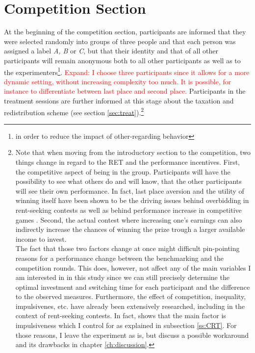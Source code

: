     
    \section{Competition Section}
    \label{ss:compt}
    
    At the beginning of the competition section, participants are informed that they were selected randomly into groups of three people and that each person was assigned a label \textit{A, B} or \textit{C}, but that their identity and that of all other participants will remain anonymous both to all other participants as well as to the experimenters\footnote{in order to reduce the impact of other-regarding behavior}. \textcolor{red}{Expand: I choose three participants since it allows for a more dynamic setting, without increasing complexity too much. It is possible, for instance to differentiate between last place and second place.}  Participants in the treatment sessions are further informed at this stage about the taxation and redistribution scheme (see section \ref{sec:treat}).\footnote{ Note that when moving from the introductory section to the competition, two things change in regard to the RET and the performance incentives. First, the competitive aspect of being in the group. Participants will have the possibility to see what others do and will know, that the other participants will see their own performance. In fact, last place aversion and the utility of winning itself have been shown to be the driving issues behind overbidding in rent-seeking contests as well as behind performance increase in competitive games \citep{sheremeta2013}. Second, the actual contest where increasing one's earnings can also indirectly increase the chances of winning the prize trough a larger available income to invest.\\
    The fact that those two factors change at once might difficult pin-pointing reasons for a performance change between the benchmarking and the competition rounds. This does, however, not affect any of the main variables I am interested in in this study since we can still precisely determine the optimal investment and switching time for each participant and the difference to the observed measures. Furthermore, the effect of competition, inequality, impulsivenes, etc. have already been extensively researched, including in the context of rent-seeking contests. In fact, \cite{sheremeta2016} shows that the main factor is impulsiveness which I control for as explained in subsection \ref{ss:CRT}. For those reasons, I leave the experiment as is, but discuss a possible workaround and its drawbacks in chapter \ref{ch:discussion}.} 
    

